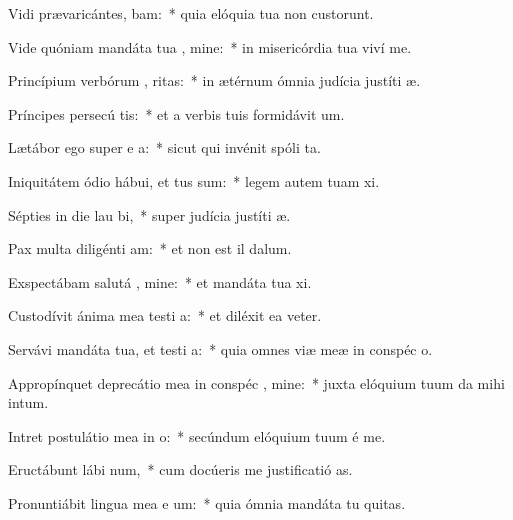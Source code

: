 \item Vidi prævaricántes,  bam:~* quia elóquia tua non custorunt.
\item Vide quóniam mandáta tua , mine:~* in misericórdia tua viví me.
\item Princípium verbórum , ritas:~* in ætérnum ómnia judícia justíti æ.
\item Príncipes persecú   tis:~* et a verbis tuis formidávit  um.
\item Lætábor ego super e a:~* sicut qui invénit spóli ta.
\item Iniquitátem ódio hábui, et tus sum:~* legem autem tuam xi.
\item Sépties in die lau  bi,~* super judícia justíti æ.
\item Pax multa diligénti  am:~* et non est il dalum.
\item Exspectábam salutá , mine:~* et mandáta tua xi.
\item Custodívit ánima mea testi a:~* et diléxit ea veter.
\item Servávi mandáta tua, et testi a:~* quia omnes viæ meæ in conspéc o.
\item Appropínquet deprecátio mea in conspéc , mine:~* juxta elóquium tuum da mihi intum.
\item Intret postulátio mea in  o:~* secúndum elóquium tuum é me.
\item Eructábunt lábi  num,~* cum docúeris me justificatió as.
\item Pronuntiábit lingua mea e um:~* quia ómnia mandáta tu quitas.
